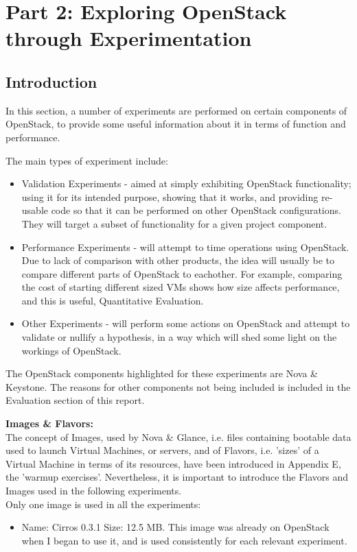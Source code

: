 \section{Part 2: Exploring OpenStack through Experimentation}

\subsection{Introduction}
In this section, a number of experiments are performed on certain components of OpenStack, to provide some useful information about it in terms of function and performance. 

The main types of experiment include:
\begin{itemize}
\itemsep0em
\item Validation Experiments - aimed at simply exhibiting OpenStack functionality; using it for its intended purpose, showing that it works, and providing re-usable code so that it can be performed on other OpenStack configurations. They will target a subset of functionality for a given project component. 
\item Performance Experiments - will attempt to time operations using OpenStack. Due to lack of comparison with other products, the idea will usually be to compare different parts of OpenStack to eachother. For example, comparing the cost of starting different sized VMs shows how size affects performance, and this is useful, Quantitative Evaluation. 
\item Other Experiments - will perform some actions on OpenStack and attempt to validate or nullify a hypothesis, in a way which will shed some light on the workings of OpenStack. 
\end{itemize}

The OpenStack components highlighted for these experiments are Nova \& Keystone. The reasons for other components not being included is included in the Evaluation section of this report. 

\textbf{Images \& Flavors:}\\
The concept of Images, used by Nova \& Glance, i.e. files containing bootable data used to launch Virtual Machines, or servers, and of Flavors, i.e. 'sizes' of a Virtual Machine in terms of its resources, have been introduced in Appendix E, the 'warmup exercises'. Nevertheless, it is important to introduce the Flavors and Images used in the following experiments. \\
Only one image is used in all the experiments: 
\begin{itemize}
\item Name: Cirros 0.3.1 Size: 12.5 MB. This image was already on OpenStack when I began to use it, and is used consistently for each relevant experiment. 
\end{itemize}

